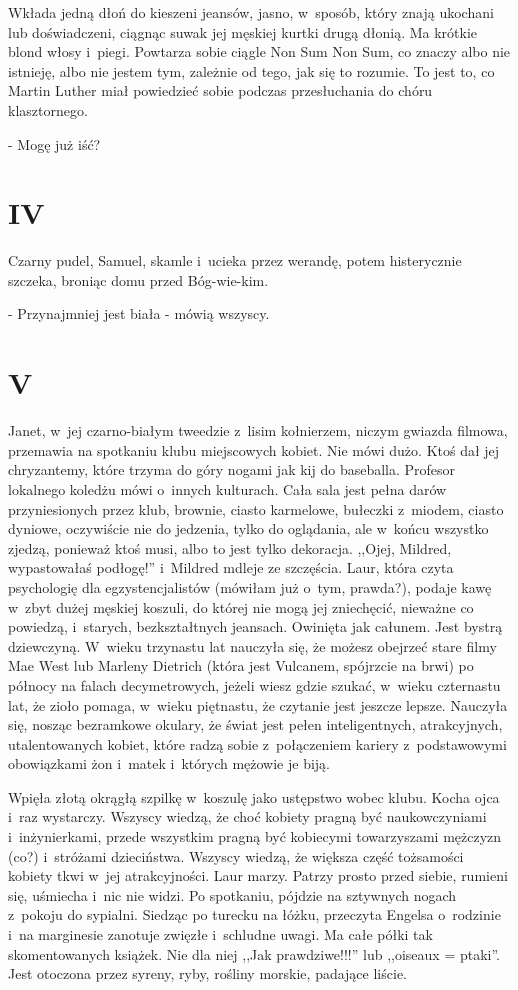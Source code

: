 \documentclass[oneside,polish,12pt,sfheadings]{mwbk}
\begin{document}
Wkłada jedną dłoń do kieszeni jeansów, jasno, w~sposób, który znają
ukochani lub doświadczeni, ciągnąc suwak jej męskiej kurtki drugą
dłonią. Ma krótkie blond włosy i~piegi. Powtarza sobie ciągle Non
Sum Non Sum, co znaczy albo nie istnieję, albo nie jestem tym, zależnie
od tego, jak się to rozumie. To jest to, co Martin Luther miał powiedzieć
sobie podczas przesłuchania do chóru klasztornego. 

- Mogę już iść?

\chapter{IV}

Czarny pudel, Samuel, skamle i~ucieka przez werandę, potem histerycznie
szczeka, broniąc domu przed Bóg-wie-kim.

- Przynajmniej jest biała - mówią wszyscy.

\chapter{V}

Janet, w~jej czarno-białym tweedzie z~lisim kołnierzem, niczym gwiazda
filmowa, przemawia na spotkaniu klubu miejscowych kobiet. Nie mówi
dużo. Ktoś dał jej chryzantemy, które trzyma do góry nogami jak kij
do baseballa. Profesor lokalnego koledżu mówi o~innych kulturach.
Cała sala jest pełna darów przyniesionych przez klub, brownie, ciasto
karmelowe, bułeczki z~miodem, ciasto dyniowe, oczywiście nie do jedzenia,
tylko do oglądania, ale w~końcu wszystko zjedzą, ponieważ ktoś musi,
albo to jest tylko dekoracja. ,,Ojej, Mildred, wypastowałaś podłogę!''
 i~Mildred mdleje ze szczęścia. Laur, która czyta psychologię dla
egzystencjalistów (mówiłam już o~tym, prawda?), podaje kawę w~zbyt
dużej męskiej koszuli, do której nie mogą jej zniechęcić, nieważne
co powiedzą, i~starych, bezkształtnych jeansach. Owinięta jak całunem.
Jest bystrą dziewczyną. W~wieku trzynastu lat nauczyła się, że możesz
obejrzeć stare filmy Mae West lub Marleny Dietrich (która jest Vulcanem,
spójrzcie na brwi) po północy na falach decymetrowych, jeżeli wiesz
gdzie szukać, w~wieku czternastu lat, że zioło pomaga, w~wieku piętnastu,
że czytanie jest jeszcze lepsze. Nauczyła się, nosząc bezramkowe okulary,
że świat jest pełen inteligentnych, atrakcyjnych, utalentowanych kobiet,
które radzą sobie z~połączeniem kariery z~podstawowymi obowiązkami
żon i~matek i~których mężowie je biją.

Wpięła złotą okrągłą szpilkę w~koszulę jako ustępstwo wobec klubu.
Kocha ojca i~raz wystarczy. Wszyscy wiedzą, że choć kobiety pragną
być naukowczyniami i~inżynierkami, przede wszystkim pragną być kobiecymi
towarzyszami mężczyzn (co?) i~stróżami dzieciństwa. Wszyscy wiedzą,
że większa część tożsamości kobiety tkwi w~jej atrakcyjności. Laur
marzy. Patrzy prosto przed siebie, rumieni się, uśmiecha i~nic nie
widzi. Po spotkaniu, pójdzie na sztywnych nogach z~pokoju do sypialni.
Siedząc po turecku na łóżku, przeczyta Engelsa o~rodzinie i~na marginesie
zanotuje zwięzłe i~schludne uwagi. Ma całe półki tak skomentowanych
książek. Nie dla niej ,,Jak prawdziwe!!!'' lub ,,oiseaux = ptaki''.
Jest otoczona przez syreny, ryby, rośliny morskie, padające liście.
\end{document}
